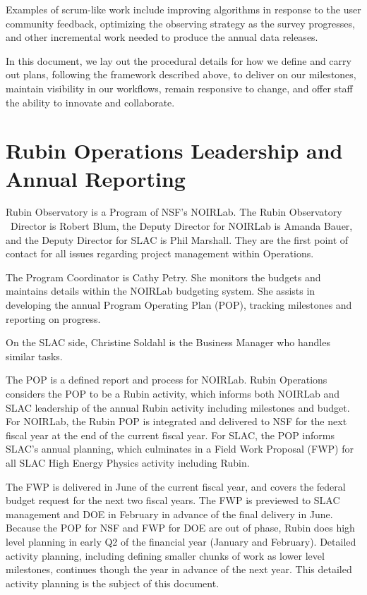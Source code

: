 Examples of scrum-like work include improving algorithms in response to the user community feedback, optimizing the observing strategy as the survey progresses, and other incremental work needed to produce the annual data releases.

In this document, we lay out the procedural details for how we define and carry out plans, following the framework described above, to deliver on our milestones, maintain visibility in our workflows, remain responsive to change, and offer staff the ability to innovate and collaborate.

\section{Rubin Operations Leadership and Annual Reporting}
\label{sec:contacts}

Rubin Observatory is a Program of NSF's NOIRLab.
The Rubin Observatory \ \gls{Director} is Robert Blum, the Deputy \gls{Director} for NOIRLab is Amanda Bauer, and the Deputy \gls{Director} for SLAC is Phil Marshall.
They are the first point of contact for all issues regarding project management within \RO Operations.

The Program Coordinator is Cathy Petry.
She monitors the budgets and maintains details within the NOIRLab budgeting system. 
She assists in developing the annual Program Operating Plan (POP), tracking milestones and reporting on progress. 

On the SLAC side, Christine Soldahl is the Business Manager who handles similar tasks. 

The POP is a defined report and process for NOIRLab. 
Rubin Operations considers the POP to be a Rubin activity, which informs both NOIRLab and SLAC leadership of the annual Rubin activity including milestones and budget. 
For NOIRLab, the Rubin POP is integrated and delivered to NSF for the next fiscal year at the end of the current fiscal year. 
For SLAC, the POP informs SLAC's annual planning, which culminates in a Field Work Proposal (FWP) for all SLAC High Energy Physics activity including Rubin. 

The FWP is delivered in June of the current fiscal year, and covers the federal budget request for the next two fiscal years. 
The FWP is previewed to SLAC management and DOE in February in advance of the final delivery in June. 
Because the POP for NSF and FWP for DOE are out of phase, Rubin does high level planning in early Q2 of the financial year (January and February). 
Detailed activity planning, including defining smaller chunks of work as lower level milestones, continues though the year in advance of the next year. 
This detailed activity planning is the subject of this document.


